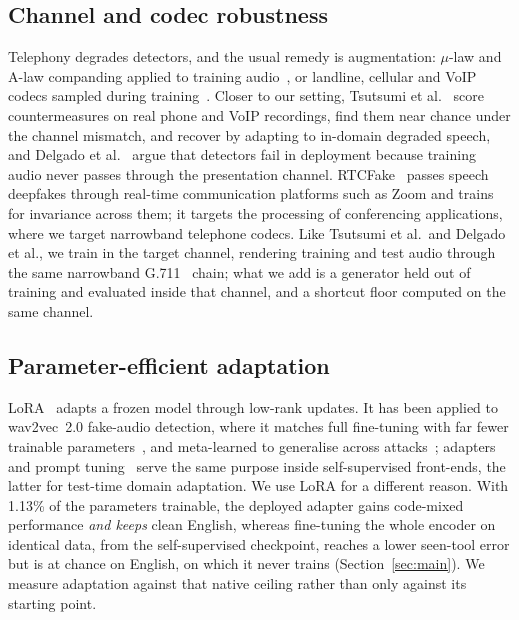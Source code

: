 \subsection{Channel and codec robustness}

Telephony degrades detectors, and the usual remedy is augmentation: $\mu$-law and
A-law companding applied to training audio~\cite{das2021companding}, or landline,
cellular and VoIP codecs sampled during training~\cite{chen2021channel}. Closer to
our setting, Tsutsumi et al.~\cite{tsutsumi2026channel} score countermeasures on real
phone and VoIP recordings, find them near chance under the channel mismatch, and
recover by adapting to in-domain degraded speech, and Delgado et
al.~\cite{delgado2026presentation} argue that detectors fail in deployment because
training audio never passes through the presentation channel. RTCFake~\cite{xue2026rtcfake}
passes speech deepfakes through real-time communication platforms such as Zoom and trains
for invariance across them; it targets the processing of conferencing applications, where we
target narrowband telephone codecs. Like Tsutsumi et al.\ and Delgado et al., we train in
the target channel, rendering training and test audio through the same narrowband
G.711~\cite{itu1988g711} chain; what we add is a generator held out of training and
evaluated inside that channel, and a shortcut floor computed on the same channel.

\subsection{Parameter-efficient adaptation}

LoRA~\cite{hu2022lora} adapts a frozen model through low-rank updates. It has been
applied to wav2vec~2.0 fake-audio detection, where it matches full fine-tuning with
far fewer trainable parameters~\cite{wang2023lora}, and meta-learned to generalise
across attacks~\cite{laakkonen2026metalora}; adapters~\cite{wu2024adapter} and prompt
tuning~\cite{oiso2024prompt} serve the same purpose inside self-supervised front-ends,
the latter for test-time domain adaptation. We use LoRA for a different reason. With
1.13\% of the parameters trainable, the deployed adapter gains code-mixed performance
\emph{and keeps} clean English, whereas fine-tuning the whole encoder on identical data,
from the self-supervised checkpoint, reaches a lower seen-tool error but is at chance on
English, on which it never trains (Section~\ref{sec:main}). We measure adaptation against that native ceiling rather
than only against its starting point.

